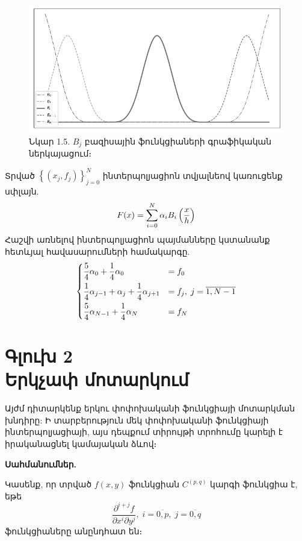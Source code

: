 \documentclass[fleqn, bachelor,subf,12pt,notitlepage]{article}
\begin{document}
\begin{figure}[H]
\centering
\includegraphics[width=1.0\textwidth]{images/all_cubic_compact_support_basis}
\captionsetup{labelformat=empty}
\caption{Նկար 1.5. $B_{j}$ բազիսային ֆունկցիաների գրաֆիկական ներկայացում։}
\end{figure}
Տրված $\left\{\left(x_{j}, f_{j}\right)\right\}_{j=0}^{N}$ ինտերպոլյացիոն տվյալնեով կառուցենք սփլայն.
\begin{equation}
F(x) = \sum_{i=0}^{N} \alpha_{i}B_{i}\left(\frac{x}{h}\right)$$
\end{equation}
Հաշվի առնելով ինտերպոլյացիոն պայմանները կստանանք հետևյալ հավասարումների համակարգը.
\begin{equation}
\begin{dcases}
\frac{5}{4}\alpha_{0} + \frac{1}{4}\alpha_{0} &= f_{0}\\
\frac{1}{4}\alpha_{j-1} + \alpha_{j} + \frac{1}{4}\alpha_{j+1} &= f_{j}, \; j=\overline{1, N-1}\\
\frac{5}{4}\alpha_{N-1} + \frac{1}{4}\alpha_{N} &= f_{N}\\
\end{dcases}
\end{equation}
\newpage
\section*{\centering Գլուխ 2 \\ Երկչափ մոտարկում}
\setcounter{equation}{0}
Այժմ դիտարկենք երկու փոփոխականի ֆունկցիայի մոտարկման խնդիրը: Ի տարբերություն մեկ փոփոխականի ֆունկցիայի ինտերպոլյացիայի, այս դեպքում տիրույթի տրոհումը կարելի է իրականացնել կամայական ձևով։

\vspace{1.5mm}
\noindent \textbf{Սահմանումներ.}

\noindent Կասենք, որ տրված $f\left(x, y\right)$ ֆունկցիան  $C^{\left(p, q\right)}$ կարգի ֆունկցիա է, եթե 
\begin{equation*}
\dfrac{\partial^{i+j} f}{\partial x^{i} \partial y^{j}}, \; i = \overline{0, p} , \; j = \overline{0, q}
\end{equation*}
ֆունկցիաները անընդհատ են։
\end{document}
